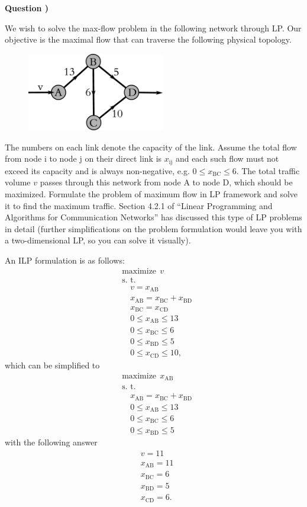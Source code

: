 \documentclass[10pt,letterpaper]{article}
\newcounter{QuestionNumber}
\newcommand{\Q}{
\textbf{Question \theQuestionNumber)}
\stepcounter{QuestionNumber}
}
\begin{document}
\Q

We wish to solve the max-flow problem in the following network through LP. Our objective is the maximal flow that can traverse the following physical topology.
\begin{figure}[h]
\centering
\includegraphics[width=60mm]{max_flow.eps}
\end{figure}
The numbers on each link denote the capacity of the link. Assume the total flow from node i to node j on their direct link is $x_\text{ij}$ and each such flow must not exceed its capacity and is always non-negative, e.g.
$
0\le x_\text{BC} \le 6.
$
The total traffic volume $v$ passes through this network from node A to node D, which should be maximized. Formulate the problem of maximum flow in LP framework and solve it to find the maximum traffic. Section 4.2.1 of ``Linear Programming and Algorithms for Communication Networks'' has discussed this type of LP problems in detail (further simplifications on the problem formulation would leave you with a two-dimensional LP, so you can solve it visually).

An ILP formulation is as follows:
\[
\begin{split}
&\text{maximize} \ \ v
\\&\text{s. t.}
\\&\quad v=x_\text{AB}
\\&\quad x_\text{AB}=x_\text{BC}+x_\text{BD}
\\&\quad x_\text{BC}=x_\text{CD}
\\&\quad 0\le x_\text{AB}\le 13
\\&\quad 0\le x_\text{BC}\le 6
\\&\quad 0\le x_\text{BD}\le 5
\\&\quad 0\le x_\text{CD}\le 10,
\end{split}
\]
which can be simplified to
\[
\begin{split}
&\text{maximize} \ \ x_\text{AB}
\\&\text{s. t.}
\\&\quad x_\text{AB}=x_\text{BC}+x_\text{BD}
\\&\quad 0\le x_\text{AB}\le 13
\\&\quad 0\le x_\text{BC}\le 6
\\&\quad 0\le x_\text{BD}\le 5
\end{split}
\]
with the following answer
\[
\begin{split}
&v=11
\\&x_\text{AB}=11
\\&x_\text{BC}=6
\\&x_\text{BD}=5
\\&x_\text{CD}=6.
\end{split}
\]
\end{document}
